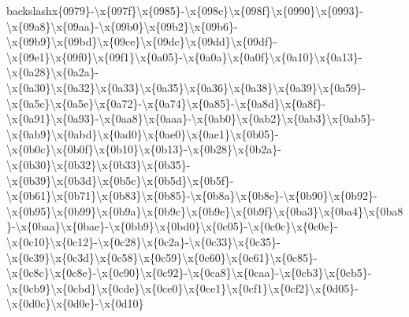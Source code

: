 \begin{DoxyCompactItemize}
backslash{}x\{0979\}-\/\textbackslash{}x\{097f\}\textbackslash{}x\{0985\}-\/\textbackslash{}x\{098c\}\textbackslash{}x\{098f\}\textbackslash{}x\{0990\}\textbackslash{}x\{0993\}-\/\textbackslash{}x\{09a8\}\textbackslash{}x\{09aa\}-\/\textbackslash{}x\{09b0\}\textbackslash{}x\{09b2\}\textbackslash{}x\{09b6\}-\/\textbackslash{}x\{09b9\}\textbackslash{}x\{09bd\}\textbackslash{}x\{09ce\}\textbackslash{}x\{09dc\}\textbackslash{}x\{09dd\}\textbackslash{}x\{09df\}-\/\textbackslash{}x\{09e1\}\textbackslash{}x\{09f0\}\textbackslash{}x\{09f1\}\textbackslash{}x\{0a05\}-\/\textbackslash{}x\{0a0a\}\textbackslash{}x\{0a0f\}\textbackslash{}x\{0a10\}\textbackslash{}x\{0a13\}-\/\textbackslash{}x\{0a28\}\textbackslash{}x\{0a2a\}-\/\textbackslash{}x\{0a30\}\textbackslash{}x\{0a32\}\textbackslash{}x\{0a33\}\textbackslash{}x\{0a35\}\textbackslash{}x\{0a36\}\textbackslash{}x\{0a38\}\textbackslash{}x\{0a39\}\textbackslash{}x\{0a59\}-\/\textbackslash{}x\{0a5c\}\textbackslash{}x\{0a5e\}\textbackslash{}x\{0a72\}-\/\textbackslash{}x\{0a74\}\textbackslash{}x\{0a85\}-\/\textbackslash{}x\{0a8d\}\textbackslash{}x\{0a8f\}-\/\textbackslash{}x\{0a91\}\textbackslash{}x\{0a93\}-\/\textbackslash{}x\{0aa8\}\textbackslash{}x\{0aaa\}-\/\textbackslash{}x\{0ab0\}\textbackslash{}x\{0ab2\}\textbackslash{}x\{0ab3\}\textbackslash{}x\{0ab5\}-\/\textbackslash{}x\{0ab9\}\textbackslash{}x\{0abd\}\textbackslash{}x\{0ad0\}\textbackslash{}x\{0ae0\}\textbackslash{}x\{0ae1\}\textbackslash{}x\{0b05\}-\/\textbackslash{}x\{0b0c\}\textbackslash{}x\{0b0f\}\textbackslash{}x\{0b10\}\textbackslash{}x\{0b13\}-\/\textbackslash{}x\{0b28\}\textbackslash{}x\{0b2a\}-\/\textbackslash{}x\{0b30\}\textbackslash{}x\{0b32\}\textbackslash{}x\{0b33\}\textbackslash{}x\{0b35\}-\/\textbackslash{}x\{0b39\}\textbackslash{}x\{0b3d\}\textbackslash{}x\{0b5c\}\textbackslash{}x\{0b5d\}\textbackslash{}x\{0b5f\}-\/\textbackslash{}x\{0b61\}\textbackslash{}x\{0b71\}\textbackslash{}x\{0b83\}\textbackslash{}x\{0b85\}-\/\textbackslash{}x\{0b8a\}\textbackslash{}x\{0b8e\}-\/\textbackslash{}x\{0b90\}\textbackslash{}x\{0b92\}-\/\textbackslash{}x\{0b95\}\textbackslash{}x\{0b99\}\textbackslash{}x\{0b9a\}\textbackslash{}x\{0b9c\}\textbackslash{}x\{0b9e\}\textbackslash{}x\{0b9f\}\textbackslash{}x\{0ba3\}\textbackslash{}x\{0ba4\}\textbackslash{}x\{0ba8\}-\/\textbackslash{}x\{0baa\}\textbackslash{}x\{0bae\}-\/\textbackslash{}x\{0bb9\}\textbackslash{}x\{0bd0\}\textbackslash{}x\{0c05\}-\/\textbackslash{}x\{0c0c\}\textbackslash{}x\{0c0e\}-\/\textbackslash{}x\{0c10\}\textbackslash{}x\{0c12\}-\/\textbackslash{}x\{0c28\}\textbackslash{}x\{0c2a\}-\/\textbackslash{}x\{0c33\}\textbackslash{}x\{0c35\}-\/\textbackslash{}x\{0c39\}\textbackslash{}x\{0c3d\}\textbackslash{}x\{0c58\}\textbackslash{}x\{0c59\}\textbackslash{}x\{0c60\}\textbackslash{}x\{0c61\}\textbackslash{}x\{0c85\}-\/\textbackslash{}x\{0c8c\}\textbackslash{}x\{0c8e\}-\/\textbackslash{}x\{0c90\}\textbackslash{}x\{0c92\}-\/\textbackslash{}x\{0ca8\}\textbackslash{}x\{0caa\}-\/\textbackslash{}x\{0cb3\}\textbackslash{}x\{0cb5\}-\/\textbackslash{}x\{0cb9\}\textbackslash{}x\{0cbd\}\textbackslash{}x\{0cde\}\textbackslash{}x\{0ce0\}\textbackslash{}x\{0ce1\}\textbackslash{}x\{0cf1\}\textbackslash{}x\{0cf2\}\textbackslash{}x\{0d05\}-\/\textbackslash{}x\{0d0c\}\textbackslash{}x\{0d0e\}-\/\textbackslash{}x\{0d10\}
\end{DoxyCompactItemize}
